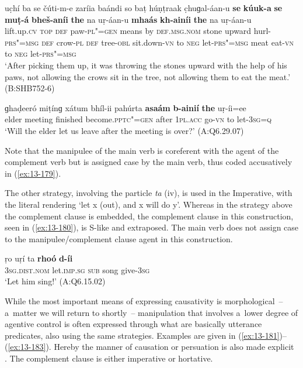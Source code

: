 \begin{exe}
\ex
\label{ex:13-178}
\gll uc̣hí ba se čúti-m-e zaríia baándi  so baṭ húṇṭraak c̣huɡal-áan-u \textbf{se} \textbf{kúuk-a} \textbf{se} \textbf{muṭ-á} \textbf{bheš-aníi} \textbf{the} na  uṛ-áan-u \textbf{mhaás} \textbf{kh-ainíi} \textbf{the} na uṛ-áan-u\\
lift.up.\textsc{cv} \textsc{top} \textsc{def} paw-\textsc{pl"=gen} means by  \textsc{def.msg.nom} stone upward hurl-\textsc{prs"=msg}  \textsc{def} crow-\textsc{pl} \textsc{def} tree-\textsc{obl} sit.down-\textsc{vn} to \textsc{neg} let-\textsc{prs"=msg} meat eat-\textsc{vn} to \textsc{neg} let-\textsc{prs"=msg}\\
\glt `After picking them up, it was throwing the stones upward with the help of his paws, not allowing the crows sit in the tree, not allowing them to eat the meat.' (B:SHB752-6)

\ex
\label{ex:13-179}
\gll ɡhaḍeeró miṭínɡ xátum bhíl-ii pahúrta \textbf{asaám} \textbf{b-ainií} \textbf{the} uṛ-íi=ee\\
elder meeting finished become.\textsc{pptc"=gen} after \textsc{1pl.acc} go-\textsc{vn} to let-\textsc{3sg=q}\\
\glt `Will the elder let us leave after the meeting is over?' (A:Q6.29.07) 
\end{exe}

Note that the manipulee of the main verb is coreferent with the agent of the complement verb but is assigned case by the main verb, thus coded accusatively in (\ref{ex:13-179}).


The other strategy, involving the particle \textit{ta} (iv), is used in the Imperative, with the literal rendering `let x (out), and x will do y'. Whereas in the strategy above the complement clause is embedded, the complement clause in this construction, seen in (\ref{ex:13-180}), is S-like and extraposed. The main verb does not assign case to the manipulee/complement clause agent in this construction.

\begin{exe}
\ex
\label{ex:13-180}
\gll ṛo uṛí ta \textbf{rhoó} \textbf{d-íi} \\
\textsc{3sg.dist.nom} let.\textsc{imp.sg} \textsc{ sub} song give-\textsc{3sg} \\
\glt `Let him sing!' (A:Q6.15.02) 
\end{exe}

 While the most important means of expressing causativity is morphological~-- a~matter we will return to shortly~-- manipulation that involves a~lower degree of agentive control \citep[45]{givon2001b} is often expressed through what are basically utterance predicates, also using the same strategies. Examples are given in (\ref{ex:13-181})--(\ref{ex:13-183}). Hereby the manner of causation or persuation is also made explicit \citep[136]{noonan2007}. The complement clause is either imperative or hortative.

